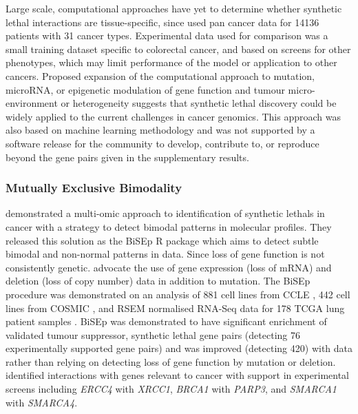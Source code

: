 Large scale, computational approaches have yet to determine whether \gls{synthetic lethal} interactions are tissue-specific, since \citet{Lu2015} used \gls{pan cancer} data for 14136 patients with 31 cancer types. Experimental data used for comparison was a small training dataset specific to colorectal cancer, and based on screens for other phenotypes, which may limit performance of the model or application to other cancers. Proposed expansion of the computational approach to \gls{mutation}, \gls{microRNA}, or epigenetic modulation of gene function and tumour micro-environment or heterogeneity suggests that \gls{synthetic lethal} discovery could be widely applied to the current challenges in cancer \glspl{genomic}. This approach was also based on machine learning methodology and was not supported by a software release for the community to develop, contribute to, or reproduce beyond the gene pairs given in the supplementary results. 

\subsubsection{Mutually Exclusive Bimodality}

\citet{Wappett2016} demonstrated a multi-omic approach to identification of \glspl{synthetic lethal} in cancer with a strategy to detect bimodal patterns in \glspl{molecular profile}. They released this solution as the \gls{BiSEp} R package \citep{Wappett2014} which aims to detect subtle bimodal and non-normal patterns in  data. Since loss of gene function is not consistently genetic. \citet{Wappett2016} advocate the use of \gls{gene expression} (loss of \acrshort{mRNA}) and deletion (loss of copy number) data in addition to \gls{mutation}. The \gls{BiSEp} procedure was demonstrated on an analysis of 881 cell lines from \gls{CCLE} \citep{Barretina2012}, 442 cell lines from \gls{COSMIC} \citep{Forbes2015}, and \gls{RSEM} normalised \gls{RNA-Seq} data for 178 \gls{TCGA} lung patient samples \citep{TCGA2014LU}. \gls{BiSEp} was demonstrated to have significant enrichment of validated \gls{tumour suppressor}, \gls{synthetic lethal} gene pairs (detecting 76 experimentally supported gene pairs) and was improved (detecting 420) with  data rather than relying on detecting loss of gene function by \gls{mutation} or deletion. \citet{Wappett2016} identified interactions with genes relevant to cancer with support in experimental screens including \textit{ERCC4} with \textit{XRCC1}, \textit{BRCA1} with \textit{PARP3}, and \textit{SMARCA1} with \textit{SMARCA4}.

